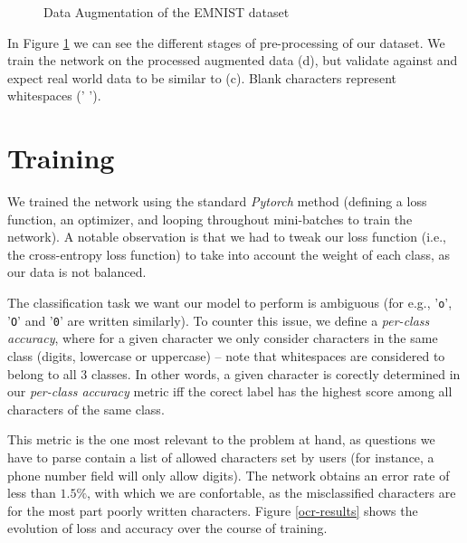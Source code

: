\documentclass[11pt, a4paper]{report}
\def\code#1{\texttt{#1}}
\begin{document}
\begin{figure}[!h]
\begin{center}
		\hspace{1cm}
	\end{center}
	\caption{Data Augmentation of the EMNIST dataset}
	\label{emnist-transformation}
\end{figure}

In Figure \ref{emnist-transformation} we can see the different stages of pre-processing of our dataset. We train the network on the processed augmented data (d), but validate against and expect real world data to be similar to (c). Blank characters represent whitespaces (' ').

\section{Training}

We trained the network using the standard \textit{Pytorch} method (defining a loss function, an optimizer, and looping throughout mini-batches to train the network). A notable observation is that we had to tweak our loss function (i.e., the cross-entropy loss function) to take into account the weight of each class, as our data is not balanced.

The classification task we want our model to perform is ambiguous (for e.g., '\code{o}', '\code{O}' and '\code{0}' are written similarly). To counter this issue, we define a \textit{per-class accuracy}, where for a given character we only consider characters in the same class (digits, lowercase or uppercase) -- note that whitespaces are considered to belong to all $3$ classes. In other words, a given character is corectly determined in our \textit{per-class accuracy} metric iff the corect label has the highest score among all characters of the same class.

This metric is the one most relevant to the problem at hand, as questions we have to parse contain a list of allowed characters set by users (for instance, a phone number field will only allow digits). The network obtains an error rate of less than $1.5\%$, with which we are confortable, as the misclassified characters are for the most part poorly written characters. Figure \ref{ocr-results} shows the evolution of loss and accuracy over the course of training. 
\end{document}
